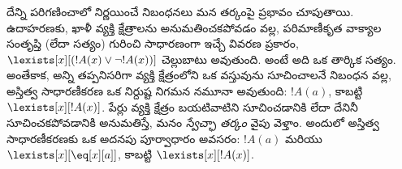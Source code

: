 \documentclass[../../../include/open-logic-section]{subfiles}
\begin{document}
\begin{digress}
దేన్ని  పరిగణించాలో నిర్ణయించే నిబంధనలు మన
తర్కంపై ప్రభావం చూపుతాయి. ఉదాహరణకు, ఖాళీ వ్యక్తి క్షేత్రాలను అనుమతించకపోవడం
వల్ల, పరిమాణీకృత వాక్యాల సంతృప్తి (లేదా సత్యం) గురించి సాధారణంగా
ఇచ్చే వివరణ ప్రకారం, $\lexists[x][(!A(x) \lor \lnot !A(x))]$
చెల్లుబాటు అవుతుంది. అంటే అది ఒక తార్కిక సత్యం. అంతేకాక, అన్ని
 తప్పనిసరిగా వ్యక్తి క్షేత్రంలోని ఒక వస్తువును సూచించాలనే
నిబంధన వల్ల, అస్తిత్వ సాధారణీకరణ ఒక నిర్దుష్ట నిగమన నమూనా అవుతుంది:
$!A(a)$, కాబట్టి $\lexists[x][!A(x)]$. పేర్లు వ్యక్తి క్షేత్రం బయటివాటిని
సూచించడానికి లేదా దేనినీ సూచించకపోవడానికి అనుమతిస్తే, మనం
\emph{స్వేచ్ఛా తర్కం} వైపు వెళ్తాం. అందులో అస్తిత్వ సాధారణీకరణకు ఒక
అదనపు పూర్వాధారం అవసరం: $!A(a)$ మరియు $\lexists[x][\eq[x][a]]$,
కాబట్టి $\lexists[x][!A(x)]$.
\end{digress}
\end{document}
